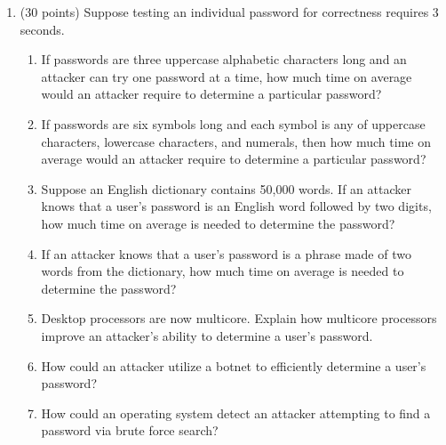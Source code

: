 \documentclass[letterpaper]{article}
\begin{document}
\begin{enumerate}
\item (30 points) Suppose testing an individual password for correctness requires 3 seconds.
\begin{enumerate}
\item If passwords are three uppercase alphabetic characters long and an attacker can try one password at a time, how much time on average would an attacker require to determine a particular password?
\item If passwords are six symbols long and each symbol is any of uppercase characters, lowercase
characters, and numerals, then how much time on average would an attacker require to determine a
particular password?
\item Suppose an English dictionary contains 50,000 words. If an attacker knows that a user's password is an English word followed by two digits, how much time on average is needed to determine the password?
\item If an attacker knows that a user's password is a phrase made of two words from the dictionary, how much time on average is needed to determine the password?
\item Desktop processors are now multicore. Explain how multicore processors improve an attacker's ability to determine a user's password.
\item How could an attacker utilize a botnet to efficiently determine a user's password?
\item How could an operating system detect an attacker attempting to find a password via brute force search?
\end{enumerate}

\end{enumerate}
\end{document}
